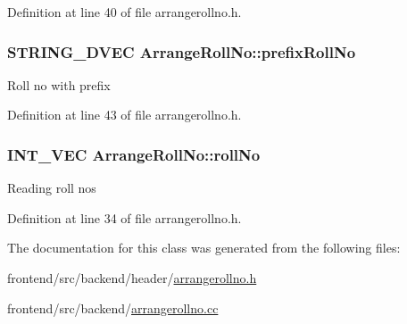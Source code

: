 Definition at line 40 of file arrangerollno.\-h.

\hypertarget{classArrangeRollNo_aa0401159b5d59c7afe77980a391a9a0a}{
\subsubsection[{prefix\-Roll\-No}]{\setlength{\rightskip}{0pt plus 5cm}S\-T\-R\-I\-N\-G\-\_\-D\-V\-E\-C Arrange\-Roll\-No\-::prefix\-Roll\-No\hspace{0.3cm}{\ttfamily [protected]}}}\label{classArrangeRollNo_aa0401159b5d59c7afe77980a391a9a0a}
Roll no with prefix 

Definition at line 43 of file arrangerollno.\-h.

\hypertarget{classArrangeRollNo_ad75d3ee3f709606da5b4871098c3e978}{
\subsubsection[{roll\-No}]{\setlength{\rightskip}{0pt plus 5cm}I\-N\-T\-\_\-\-V\-E\-C Arrange\-Roll\-No\-::roll\-No\hspace{0.3cm}{\ttfamily [protected]}}}\label{classArrangeRollNo_ad75d3ee3f709606da5b4871098c3e978}
Reading roll nos 

Definition at line 34 of file arrangerollno.\-h.



The documentation for this class was generated from the following files\-:\begin{DoxyCompactItemize}
\item 
frontend/src/backend/header/\hyperlink{arrangerollno_8h}{arrangerollno.\-h}\item 
frontend/src/backend/\hyperlink{arrangerollno_8cc}{arrangerollno.\-cc}\end{DoxyCompactItemize}

